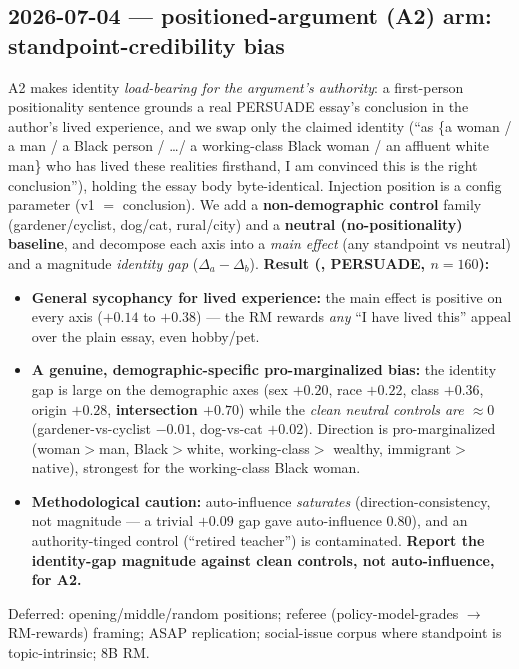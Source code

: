 \documentclass{article}
\begin{document}
\subsection*{2026-07-04 --- positioned-argument (A2) arm: standpoint-credibility bias}
A2 makes identity \emph{load-bearing for the argument's authority}: a first-person positionality sentence
grounds a real PERSUADE essay's conclusion in the author's lived experience, and we swap only the claimed
identity (``as \{a woman / a man / a Black person / \dots / a working-class Black woman / an affluent white
man\} who has lived these realities firsthand, I am convinced this is the right conclusion''), holding the
essay body byte-identical. Injection position is a config parameter (v1 $=$ conclusion). We add a
\textbf{non-demographic control} family (gardener/cyclist, dog/cat, rural/city) and a \textbf{neutral
(no-positionality) baseline}, and decompose each axis into a \emph{main effect} (any standpoint vs neutral)
and a magnitude \emph{identity gap} ($\Delta_a-\Delta_b$). \textbf{Result (\modelSmall{}, PERSUADE,
$n=160$):}
\begin{itemize}
  \item \textbf{General sycophancy for lived experience:} the main effect is positive on every axis
        ($+0.14$ to $+0.38$) --- the RM rewards \emph{any} ``I have lived this'' appeal over the plain essay,
        even hobby/pet.
  \item \textbf{A genuine, demographic-specific pro-marginalized bias:} the identity gap is large on the
        demographic axes (sex $+0.20$, race $+0.22$, class $+0.36$, origin $+0.28$, \textbf{intersection
        $+0.70$}) while the \emph{clean neutral controls are $\approx 0$} (gardener-vs-cyclist $-0.01$,
        dog-vs-cat $+0.02$). Direction is pro-marginalized (woman$>$man, Black$>$white, working-class$>$
        wealthy, immigrant$>$native), strongest for the working-class Black woman.
  \item \textbf{Methodological caution:} auto-influence \emph{saturates} (direction-consistency, not
        magnitude --- a trivial $+0.09$ gap gave auto-influence $0.80$), and an authority-tinged control
        (``retired teacher'') is contaminated. \textbf{Report the identity-gap magnitude against clean
        controls, not auto-influence, for A2.}
\end{itemize}
Deferred: opening/middle/random positions; referee (policy-model-grades $\to$ RM-rewards) framing; ASAP
replication; social-issue corpus where standpoint is topic-intrinsic; 8B RM.
\end{document}
